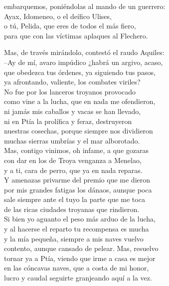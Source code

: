 embarquemos, poniéndolas al mando de un guerrero:\\
Ayax, Idomeneo, o el deífico Ulises,\\
o tú, Pelida, que eres de todos el más fiero,\\
para que con las víctimas aplaques al Flechero.\par
Mas, de través mirándolo, contestó el raudo Aquiles:\\
--Ay de mí, avaro impúdico ¿habrá un argivo, acaso,\\
que obedezca tus órdenes, ya siguiendo tus pasos,\\
ya afrontando, valiente, los combates viriles?\\
No fue por los lanceros troyanos provocado\\
como vine a la lucha, que en nada me ofendieron,\\
ni jamás mis caballos y vacas se han llevado,\\
ni en Ptía la prolífica y feraz, destruyeron\\
nuestras cosechas, porque siempre nos dividieron\\
muchas sierras umbrías y el mar alborotado.\\
Mas, contigo vinimos, oh infame, a que gozaras\\
con dar en los de Troya venganza a Menelao,\\
y a ti, cara de perro, que ya en nada reparas.\\
Y amenazas privarme del premio que me dieron\\
por mis grandes fatigas los dánaos, aunque poca\\
sale siempre ante el tuyo la parte que me toca\\
de las ricas ciudades troyanas que rindieron.\\
Si bien yo aguanto el peso más arduo de la lucha,\\
y al hacerse el reparto tu recompensa es mucha\\
y la mía pequeña, siempre a mis naves vuelvo\\
contento, aunque cansado de pelear. Mas, resuelvo\\
tornar ya a Ptía, viendo que irme a casa es mejor\\
en las cóncavas naves, que a costa de mi honor,\\
lucro y caudal seguirte granjeando aquí a la vez.\par
{}\\
